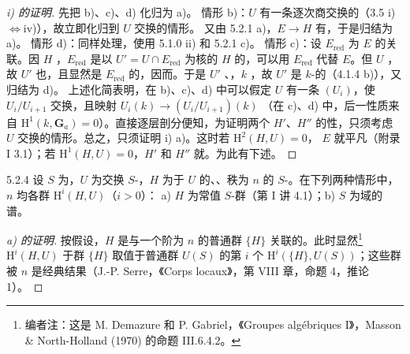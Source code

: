 \begin{proof}[i) 的证明]
先把 b)、c)、d) 化归为 a)。
情形 b)：$U$ 有一条逐次商交换的（3.5 i)$\Leftrightarrow$iv)），故立即化归到 $U$ 交换的情形。
又由 5.2.1 a)，$E\to H$ 有，于是归结为 a)。
情形 d)：同样处理，使用 5.1.0 ii) 和 5.2.1 c)。
情形 c)：设 $E_{\mathrm{red}}$ 为 $E$ 的关联。因 $H$ ，$E_{\mathrm{red}}$ 是以 $U'=U\cap E_{\mathrm{red}}$ 为核的 $H$ 的，可以用 $E_{\mathrm{red}}$ 代替 $E$。但 $U$ ，故 $U'$ 也，且显然是 $E_{\mathrm{red}}$ 的，因而。于是 $U'$ 、，$k$ ，故 $U'$ 是 $k$-的（4.1.4 b)），又归结为 d)。
上述化简表明，在 b)、c)、d) 中可以假定 $U$ 有一条 $(U_i)$，使 $U_i/U_{i+1}$ 交换，且映射 $U_i(k)\to(U_i/U_{i+1})(k)$ （在 c)、d) 中，后一性质来自 $\mathrm H^1(k,\mathbf G_a)=0$）。直接逐层剖分便知，为证明两个 $H'$、$H''$ 的性，只须考虑 $U$ 交换的情形。总之，只须证明 i) a)。这时若 $\mathrm H^2(H,U)=0$， $E$ 就平凡（附录 I 3.1）；若 $\mathrm H^1(H,U)=0$，$H'$ 和 $H''$ 就。为此有下述。
\end{proof}
\begin{SGAresult}{}{5.2.4}
设 $S$ 为，$U$ 为交换 $S$-，$H$ 为于 $U$ 的、、秩为 $n$ 的 $S$-。在下列两种情形中，$n$ 均各群 $\mathrm H^i(H,U)$（$i>0$）：
a) $H$ 为常值 $S$-群（第 I 讲 4.1）；b) $S$ 为域的谱。
\end{SGAresult}
\begin{proof}[a) 的证明]
按假设，$H$ 是与一个阶为 $n$ 的普通群 $\{H\}$ 关联的。此时显然\footnote{编者注：这是 M. Demazure 和 P. Gabriel，《Groupes algébriques I》，Masson \& North-Holland (1970) 的命题 III.6.4.2。}$\mathrm H^i(H,U)$ 于群 $\{H\}$ 取值于普通群 $U(S)$ 的第 $i$ 个 $\mathrm H^i(\{H\},U(S))$；这些群被 $n$ 是经典结果（J.-P. Serre，《Corps locaux》，第 VIII 章，命题 4，推论 1）。
\end{proof}
